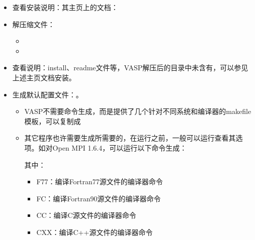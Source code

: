 \documentclass[a4paper,12pt,english]{sphinxmanual}
\begin{document}
\begin{itemize}
\item {} 
\sphinxAtStartPar
查看安装说明：其主页上的文档：

\item {} 
\sphinxAtStartPar
解压缩文件：
\begin{itemize}
\item {} 
\sphinxAtStartPar
{}

\item {} 
\sphinxAtStartPar
{}

\end{itemize}

\item {} 
\sphinxAtStartPar
查看说明：install、readme文件等，VASP解压后的目录中未含有，可以参见上述主页文档安装。

\item {} 
\sphinxAtStartPar
生成默认配置文件：。
\begin{itemize}
\item {} 
\sphinxAtStartPar
VASP不需要命令生成，而是提供了几个针对不同系统和编译器的makefile模板，可以复制成

\item {} 
\sphinxAtStartPar
其它程序也许需要生成所需要的，在运行之前，一般可以运行查看其选项。如对Open
MPI 1.6.4，可以运行以下命令生成：

\sphinxAtStartPar
{}

\sphinxAtStartPar
其中：
\begin{itemize}
\item {} 
\sphinxAtStartPar
F77：编译Fortran77源文件的编译器命令

\item {} 
\sphinxAtStartPar
FC：编译Fortran90源文件的编译器命令

\item {} 
\sphinxAtStartPar
CC：编译C源文件的编译器命令

\item {} 
\sphinxAtStartPar
CXX：编译C++源文件的编译器命令


\end{itemize}
\end{itemize}
\end{itemize}
\end{document}
